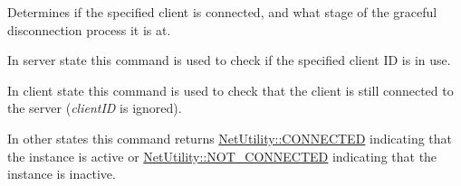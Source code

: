 Determines if the specified client is connected, and what stage of the graceful disconnection process it is at. 

In server state this command is used to check if the specified client ID is in use. \par
 In client state this command is used to check that the client is still connected to the server ({\itshape clientID\/} is ignored). \par
 In other states this command returns \hyperlink{class_net_utility_a7eae52138f8bd597ffc67ebf07e86b6da9c07ac24fb9bdd4157ace978968721fd}{NetUtility::CONNECTED} indicating that the instance is active or \hyperlink{class_net_utility_a7eae52138f8bd597ffc67ebf07e86b6daef8b7210b8ae3961e19fcde743ee08af}{NetUtility::NOT\_\-CONNECTED} indicating that the instance is inactive.


